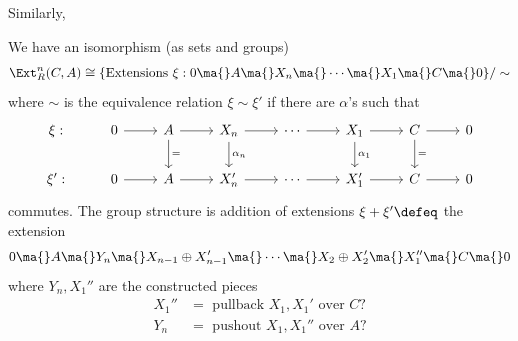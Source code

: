 Similarly, 
\begin{thm}
We have an isomorphism (as sets and groups)
\[
\Ext_R^n(C,A) \cong \{\text{Extensions } \xi: 0 \ma{} A \ma{} X_n \ma{} \cdots \ma{} X_1 \ma{} C \ma{} 0\}/ \sim
\]
where $\sim$ is the equivalence relation $\xi \sim \xi'$ if there are $\alpha$'s such that 
\[
\begin{tikzcd}
\xi: & 0 \arrow{r} & A \arrow{d}{=} \arrow{r} & X_n \arrow{r} \arrow{d}{\alpha_n} & \cdots \arrow{r} & X_1 \arrow{d}{\alpha_1} \arrow{r} & C \arrow{d}{=} \arrow{r} & 0 \\
\xi': & 0 \arrow{r} & A \arrow{r} & X_n' \arrow{r} & \cdots \arrow{r} & X_1' \arrow{r} & C \arrow{r} & 0 
\end{tikzcd}
\]
commutes. The group structure is addition of extensions $\xi+\xi' \defeq$ the extension
\[
0 \ma{} A \ma{} Y_n \ma{} X_{n-1} \oplus X'_{n-1} \ma{} \cdots \ma{} X_2 \oplus X_2' \ma{} X_1 '' \ma{} C \ma{} 0
\]
where $Y_n,X_1''$ are the constructed pieces
\[
\begin{split}
X_1''&= \text{ pullback } X_1,X_1' \text{ over }C? \\
Y_n &= \text{ pushout } X_1,X_1'' \text{ over }A?
\end{split}
\]

\end{thm}



































\newpage